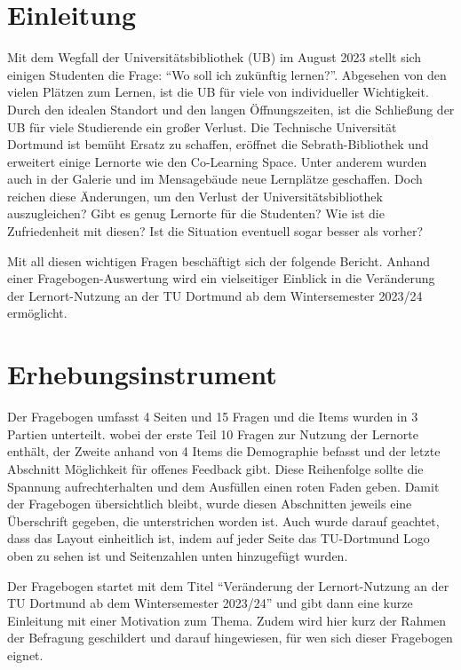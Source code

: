 \documentclass[11pt, a4paper]{article}
\begin{document}
\newpage\null\thispagestyle{empty}\newpage

\newpage
\cleardoublepage%
\section{Einleitung}
\label{Einleitung}
Mit dem Wegfall der Universitätsbibliothek (UB) im August 2023 stellt sich einigen Studenten die Frage: “Wo soll ich zukünftig lernen?”.
Abgesehen von den vielen Plätzen zum Lernen, ist die UB für viele von individueller Wichtigkeit. \cite{.27.01.2024}
Durch den idealen Standort und den langen Öffnungszeiten, ist die Schließung der UB für viele Studierende ein großer Verlust.
Die Technische Universität Dortmund ist bemüht Ersatz zu schaffen, eröffnet die Sebrath-Bibliothek und erweitert einige Lernorte wie den Co-Learning Space.
Unter anderem wurden auch in der Galerie und im Mensagebäude neue Lernplätze geschaffen.
Doch reichen diese Änderungen, um den Verlust der Universitätsbibliothek auszugleichen?
Gibt es genug Lernorte für die Studenten? Wie ist die Zufriedenheit mit diesen?
Ist die Situation eventuell sogar besser als vorher?

Mit all diesen wichtigen Fragen beschäftigt sich der folgende Bericht.
Anhand einer Fragebogen-Auswertung wird ein vielseitiger Einblick in die Veränderung der Lernort-Nutzung an der TU Dortmund ab dem Wintersemester 2023/24 ermöglicht.


\newpage
\section{Erhebungsinstrument}
\label{Erhebungsinstrument}
Der Fragebogen umfasst 4 Seiten und 15 Fragen und die Items wurden in 3 Partien unterteilt. wobei der erste Teil 10 Fragen zur Nutzung der Lernorte enthält, der Zweite anhand von 4 Items die Demographie befasst und der letzte Abschnitt Möglichkeit für offenes Feedback gibt.
Diese Reihenfolge sollte die Spannung aufrechterhalten und dem Ausfüllen einen roten Faden geben. 
Damit der Fragebogen übersichtlich bleibt, wurde diesen Abschnitten jeweils eine Überschrift gegeben, die unterstrichen worden ist.
Auch wurde darauf geachtet, dass das Layout einheitlich ist, indem auf jeder Seite das TU-Dortmund Logo oben zu sehen ist und Seitenzahlen unten hinzugefügt wurden.

Der Fragebogen startet mit dem Titel “Veränderung der Lernort-Nutzung an der TU Dortmund ab dem Wintersemester 2023/24” und gibt dann eine kurze Einleitung mit einer Motivation zum Thema. Zudem wird hier kurz der Rahmen der Befragung geschildert und darauf hingewiesen, für wen sich dieser Fragebogen eignet.
\end{document}
